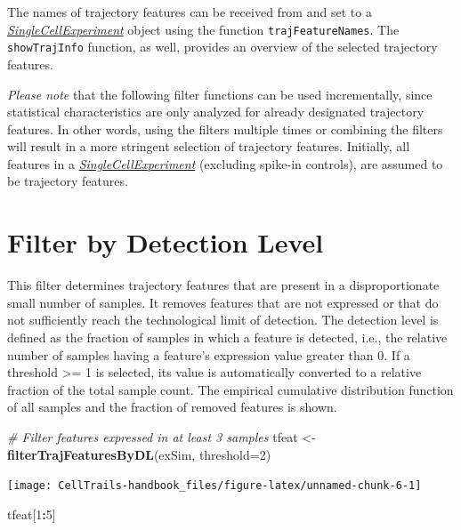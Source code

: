 \documentclass[]{book}
\newenvironment{Shaded}{\begin{snugshade}}{\end{snugshade}}
\newcommand{\KeywordTok}[1]{\textcolor[rgb]{0.13,0.29,0.53}{\textbf{#1}}}
\newcommand{\DataTypeTok}[1]{\textcolor[rgb]{0.13,0.29,0.53}{#1}}
\newcommand{\DecValTok}[1]{\textcolor[rgb]{0.00,0.00,0.81}{#1}}
\newcommand{\StringTok}[1]{\textcolor[rgb]{0.31,0.60,0.02}{#1}}
\newcommand{\CommentTok}[1]{\textcolor[rgb]{0.56,0.35,0.01}{\textit{#1}}}
\newcommand{\OperatorTok}[1]{\textcolor[rgb]{0.81,0.36,0.00}{\textbf{#1}}}
\newcommand{\NormalTok}[1]{#1}
\theoremstyle{definition}
\theoremstyle{definition}
\theoremstyle{definition}
\theoremstyle{remark}
\begin{document}
The names of trajectory features can be received from and set to a
\emph{\href{http://bioconductor.org/packages/SingleCellExperiment}{SingleCellExperiment}}
object using the function \texttt{trajFeatureNames}. The
\texttt{showTrajInfo} function, as well, provides an overview of the
selected trajectory features.

\emph{Please note} that the following filter functions can be used
incrementally, since statistical characteristics are only analyzed for
already designated trajectory features. In other words, using the
filters multiple times or combining the filters will result in a more
stringent selection of trajectory features. Initially, all features in a
\emph{\href{http://bioconductor.org/packages/SingleCellExperiment}{SingleCellExperiment}}
(excluding spike-in controls), are assumed to be trajectory features.

\section{Filter by Detection Level}\label{filter-by-detection-level}

This filter determines trajectory features that are present in a
disproportionate small number of samples. It removes features that are
not expressed or that do not sufficiently reach the technological limit
of detection. The detection level is defined as the fraction of samples
in which a feature is detected, i.e., the relative number of samples
having a feature's expression value greater than 0. If a threshold
\textgreater{}= 1 is selected, its value is automatically converted to a
relative fraction of the total sample count. The empirical cumulative
distribution function of all samples and the fraction of removed
features is shown.

\begin{Shaded}
\begin{Highlighting}[]
\CommentTok{# Filter features expressed in at least 3 samples}
\NormalTok{tfeat <-}\StringTok{ }\KeywordTok{filterTrajFeaturesByDL}\NormalTok{(exSim, }\DataTypeTok{threshold=}\DecValTok{2}\NormalTok{)}
\end{Highlighting}
\end{Shaded}

\texttt{[image: CellTrails-handbook\_files/figure-latex/unnamed-chunk-6-1]}

\begin{Shaded}
\begin{Highlighting}[]
\NormalTok{tfeat[}\DecValTok{1}\OperatorTok{:}\DecValTok{5}\NormalTok{]}
\end{Highlighting}
\end{Shaded}
\end{document}
